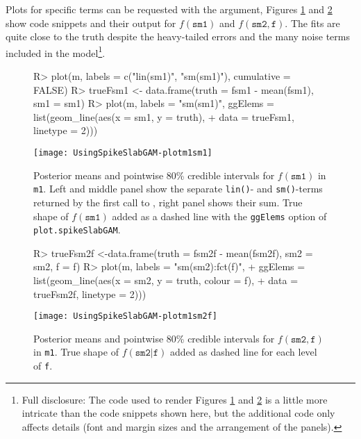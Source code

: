\documentclass[article, shortnames, nojss, noheadings, notitle]{jss}
\begin{document}
Plots for specific terms can be requested with the  argument, Figures \ref{fig:m1Sm1} and \ref{fig:m1Sm2f}
show code snippets and their output for $f(\mathtt{sm1})$ and $f(\mathtt{sm2, f})$.
The fits are quite close to the truth despite the heavy-tailed errors and the many noise terms included in the model\footnote{
Full disclosure: The code used to render Figures \ref{fig:m1Sm1} and \ref{fig:m1Sm2f} is a little more intricate
than the code snippets shown here, but the additional code only affects details (font and margin sizes and the arrangement of the
panels).}.
\begin{figure}[!htbp]\begin{center}
\tikzset{font=\small}
\begin{Schunk}
\begin{Sinput}
R> plot(m, labels = c("lin(sm1)", "sm(sm1)"), cumulative = FALSE)
R> trueFsm1 <- data.frame(truth = fsm1 - mean(fsm1), sm1 = sm1)
R> plot(m, labels = "sm(sm1)", ggElems = list(geom_line(aes(x = sm1, y = truth),
+                                                       data = trueFsm1, linetype = 2)))
\end{Sinput}
\end{Schunk}
\texttt{[image: UsingSpikeSlabGAM-plotm1sm1]}
\caption{Posterior means and pointwise 80\% credible intervals for $f(\mathtt{sm1})$ in
\texttt{m1}. Left and middle panel show the separate \texttt{lin()}- and \texttt{sm()}-terms returned by the first call to ,
right panel shows their sum. True shape of $f(\mathtt{sm1})$ added as a dashed line with the \texttt{ggElems} option of \texttt{plot.spikeSlabGAM}.}
\label{fig:m1Sm1}
\end{center}\end{figure}

\begin{figure}[!htbp]\begin{center}
\tikzset{font=\small}
\begin{Schunk}
\begin{Sinput}
R> trueFsm2f <-data.frame(truth = fsm2f - mean(fsm2f), sm2 = sm2, f = f)
R> plot(m, labels = "sm(sm2):fct(f)",
+       ggElems = list(geom_line(aes(x = sm2, y = truth, colour = f),
+                              data = trueFsm2f, linetype = 2)))
\end{Sinput}
\end{Schunk}
\texttt{[image: UsingSpikeSlabGAM-plotm1sm2f]}
\caption{Posterior means and pointwise 80\% credible intervals for $f(\mathtt{sm2}, \mathtt{f})$ in
\texttt{m1}. True shape of $f(\mathtt{sm2}|\mathtt{f})$ added as dashed line for each level of \texttt{f}.}
\label{fig:m1Sm2f}
\end{center}\end{figure}
\end{document}
